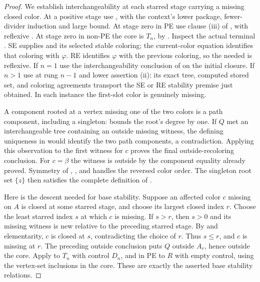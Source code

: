 \begin{proof}
We establish interchangeability at each starred stage carrying a missing
closed color.  At a positive stage use , with the context's
lower package, fewer-divider induction and large bound.  At stage zero
in PE use clause (iii) of , with reflexive
.  At stage zero in non-PE the core is
$T_n$, by .  Inspect the actual terminal
.  SE supplies
 and its selected stable coloring;
the current-color equation identifies that coloring with $\varphi$.
RE identifies $\varphi$ with the previous coloring, so the needed
 is reflexive.  If $n=1$ use the
interchangeability conclusion of  on the
initial closure.  If $n>1$ use  at rung
$n-1$ and lower assertion (ii): its exact tree, computed stored set, and
coloring agreements transport the SE or RE stability premise just obtained.
In each instance the first-slot color is genuinely missing.

A component rooted at a vertex missing one of the two colors is a path
component, including a singleton: 
bounds the root's degree by one.  If $Q$ met an interchangeable tree
containing an outside missing witness, the defining uniqueness in
 would identify the two path components,
a contradiction.  Applying this observation to the first witness for
$c$ proves the final outside-recoloring conclusion.  For $c=\beta$ the
witness is outside by the component equality already proved.  Symmetry of
, , and
 handles the reversed color order.
The singleton root set $\{z\}$ then satisfies the complete definition of
.

Here is the descent needed for base stability.  Suppose an affected color
$c$ missing on $A$ is closed at some starred stage, and choose its largest
closed index $r$.  Choose the least starred index $s$ at which $c$ is
missing.  If $s>r$, then $s>0$ and its missing witness is new relative to
the preceding starred stage.  By
 and elementarity, $c$ is closed
at $s$, contradicting the choice of $r$.  Thus $s\le r$, and $c$ is
missing at $r$.  The preceding outside conclusion puts $Q$ outside
$A_r$, hence outside the core.  Apply
 to $T_n$ with control $D_n$,
and in PE to $R$ with empty control, using the vertex-set inclusions in
the core.  These are exactly the asserted base stability relations.


\end{proof}
